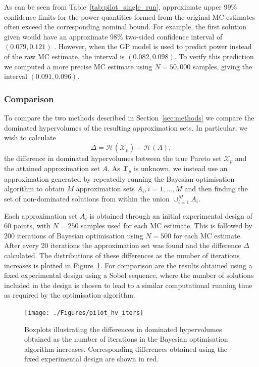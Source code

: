 \documentclass{article} %
\begin{document}
As can be seen from Table~\ref{tab:pilot_single_run}, approximate upper 99\% confidence limits for the power quantities formed from the original MC estimates often exceed the corresponding nominal bound. For example, the first solution given would have an approximate 98\% two-sided confidence interval of $(0.079, 0.121)$ . However, when the GP model is used to predict power instead of the raw MC estimate, the interval is $(0.082, 0.098)$.  To verify this prediction we computed a more precise MC estimate using $N = 50,000$ samples, giving the interval $(0.091, 0.096)$.

\subsubsection{Comparison}

To compare the two methods described in Section~\ref{sec:methods} we compare the dominated hypervolumes of the resulting approximation sets. In particular, we wish to calculate
\begin{equation}
\Delta = \mathcal{H}(\mathcal{X}_{p}) - \mathcal{H}(A),
\end{equation}
the difference in dominated hypervolumes between the true Pareto set $\mathcal{X}_{p}$ and the attained approximation set $A$. As $\mathcal{X}_{p}$ is unknown, we instead use an approximation generated by repeatedly running the Bayesian optimisation algorithm to obtain $M$ approximation sets $A_{i}, i=1, \ldots, M$ and then finding the set of non-dominated solutions from within the union $\cup_{i=1}^{M} A_{i}$.

Each approximation set $A_{i}$ is obtained through an initial experimental design of 60 points, with $N = 250$ samples used for each MC estimate. This is followed by 200 iterations of Bayesian optimisation using $N = 500$ for each MC estimate. After every 20 iterations the approximation set was found and the difference $\Delta$ calculated. The distributions of these differences as the number of iterations increases is plotted in Figure~\ref{fig:pilot_hv_iters}. For comparison are the results obtained using a fixed experimental design using a Sobol sequence, where the number of solutions included in the design is chosen to lead to a similar computational running time as required by the optimisation algorithm.

\begin{figure}
\centering
\texttt{[image: ./Figures/pilot\_hv\_iters]}
\caption{Boxplots illustrating the differences in dominated hypervolumes obtained as the number of iterations in the Bayesian optimisation algorithm increases. Corresponding differences obtained using the fixed experimental design are shown in red.}
\label{fig:pilot_hv_iters}
\end{figure}
\end{document}

